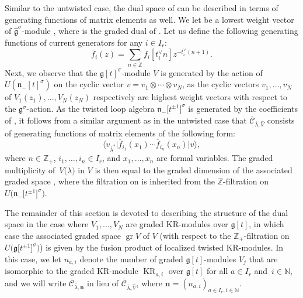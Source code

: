 \documentclass[10pt,a4paper]{amsart}
\numberwithin{equation}{section}
\DeclareMathOperator{\gr}{gr}
\DeclareMathOperator{\KR}{KR}
\DeclareMathOperator{\Hom}{Hom}
\begin{document}
Similar to the untwisted case, the dual space  of \smash{$\Hom_{\widehat{\mathfrak{g}}^{\sigma}}\bigl(\widehat{V},\widehat{V}_{\kappa k,\overline{\lambda}}\bigr)$} can be described in terms of generating functions of matrix elements as well. We let  be a lowest weight vector of $\widehat{\mathfrak{g}}^{\sigma}$-module , where  is the graded dual of . Let us define the following generating functions of current generators for any $i\in I_r$:
\begin{equation*}
\overline{f}_i(z)=
\sum_{n\in\mathbb{Z}}\overline{f}_i[t_i^{\vee}n]z^{-t_i^{\vee}(n+1)}.
\end{equation*}
Next, we observe that the $\mathfrak{g}[t]^{\sigma}$-module $V$ is generated by the action of $U(\mathfrak{n}_-[t]^{\sigma})$ on the cyclic vector $v=v_1 \otimes\cdots\otimes v_N$, as the cyclic vectors $v_1,\dots,v_N$ of $V_1(z_1),\dots,V_N(z_N)$ respectively are highest weight vectors with respect to the $\mathfrak{g}^{\sigma}$-action. As the twisted loop algebra $\mathfrak{n}_-\bigl[t^{\pm1}\bigr]^{\sigma}$ is generated by the coefficients of , it follows from a similar argument as in the untwisted case that $\overline{\mathcal{C}}_{ \overline{\lambda},\widehat{V}}$ consists of generating functions of matrix elements of the following form:
\begin{equation}\label{eq:3.8}
\big\langle v_{\overline{\lambda}^*}\big|\overline{f}_{i_1}(x_1)\cdots \overline{f}_{i_n}(x_n)\big|v\big\rangle,
\end{equation}
where $n\in\mathbb{Z}_+$, $i_1,\dots,i_n\in I_r$, and $x_1, \dots,x_n$ are formal variables. The graded multiplicity of~$V\bigl(\overline{\lambda}\bigr)$ in $V$ is then equal to the graded dimension of the associated graded space \smash{$\gr\overline{ \mathcal{C}}_{\overline{\lambda},\widehat{V}}$}, where the filtration on  is inherited from the $\mathbb{Z}$-filtration on $U\bigl(\mathfrak{n}_-\bigl[t^{\pm1}\bigr]^{\sigma}\bigr)$.

The remainder of this section is devoted to describing the structure of the dual space  in the case where $V_1,\dots,V_N$ are graded KR-modules over $\mathfrak{g}[t]$, in which case the associated graded space $\gr V$ of $V$ (with respect to the $\mathbb{Z}_+$-filtration on $U\bigl(\mathfrak{g}\bigl[t^{\pm1}\bigr]^{\sigma}\bigr)$) is given by the fusion product of localized twisted KR-modules. In this case, we let $n_{a,i}$ denote the number of graded $\mathfrak{g}[t]$-modules $V_j$ that are isomorphic to the graded KR-module $\KR_{a,i}$ over $\mathfrak{g}[t]$ for all $a\in I_r$ and~${i\in\mathbb{N}}$, and we will write $\overline{\mathcal{C}}_{\overline{\lambda}, \mathbf{n}}$ in lieu of $\overline{\mathcal{C}}_ {\overline{\lambda},\widehat{V}}$, where $\mathbf{n}=(n_{a,i})_{a\in I_r,i\in\mathbb{N}}$.
\end{document}
